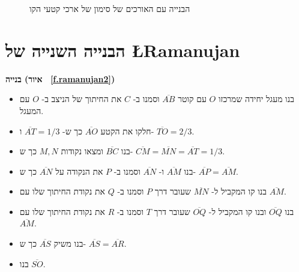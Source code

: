 \begin{figure}[htb]
\begin{center}
\end{center}
\caption{הבנייה עם האורכים של סימון של ארכי קטעי הקו}\label{f.ramanujan1a}
\end{figure}





\section{הבנייה השנייה של
\L{Ramanujan}}\label{s.square-ramanujan-second}

\textbf{%
בנייה (איור%
~\ref{f.ramanujan2})}

\begin{itemize}
\item
בנו מעגל יחידה שמרכזו
$O$
עם קוטר
$\overline{AB}$
וסמנו ב-%
$C$
את החיתוך של הניצב ב-%
$O$
עם המעגל.
\item
חלקו את הקטע
$\overline{AO}$
כך ש-%
$\overline{AT}=1/3$ 
ו-%
$\overline{TO}=2/3$.
\item
בנו
$\overline{BC}$
ומצאו נקודות
$M,N$
כך ש-%
$\overline{CM}=\overline{MN}=\overline{AT}=1/3$.
\item
בנו 
$\overline{AM}$
ו-%
$\overline{AN}$
וסמנו ב-%
$P$
את הנקודה על
$\overline{AN}$
כך ש-%
$\overline{AP}=\overline{AM}$.
\item
בנו קו המקביל ל-%
$\overline{MN}$
שעובר דרך
$P$
וסמנו ב-%
$Q$
את נקודת החיתוך שלו עם
$\overline{AM}$.
\item
בנו
$\overline{OQ}$
ובנו קו המקביל ל-%
$\overline{OQ}$
שעובר דרך 
$T$
וסמנו ב-%
$R$
את נקודת החיתוך שלו עם
$\overline{AM}$.
\item
בנו משיק
$\overline{AS}$
כך ש-%
$\overline{AS}=\overline{AR}$.
\item
בנו
$\overline{SO}$.
\end{itemize}



